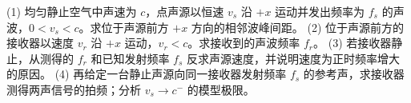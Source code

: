 (1) 均匀静止空气中声速为 \(c\)，点声源以恒速 \(v_s\) 沿 \(+x\) 运动并发出频率为 \(f_s\) 的声波，\(0<v_s<c\)。求位于声源前方 \(+x\) 方向的相邻波峰间距。
(2) 位于声源前方的接收器以速度 \(v_r\) 沿 \(+x\) 运动，\(v_r<c\)。求接收到的声波频率 \(f_r\)。
(3) 若接收器静止，从测得的 \(f_r\) 和已知发射频率 \(f_s\) 反求声源速度，并说明速度为正时频率增大的原因。
(4) 再给定一台静止声源向同一接收器发射频率 \(f_s\) 的参考声，求接收器测得两声信号的拍频；分析 \(v_s\to c^-\) 的模型极限。
